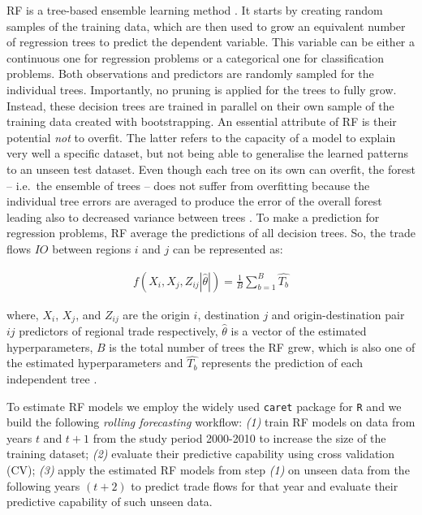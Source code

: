 \documentclass[sigconf]{acmart}
\begin{document}
RF is a tree-based ensemble learning method \citep{breiman2001random}.
It starts by creating random samples of the training data, which are
then used to grow an equivalent number of regression trees to predict
the dependent variable. This variable can be either a continuous one for
regression problems or a categorical one for classification problems.
Both observations and predictors are randomly sampled for the individual
trees. Importantly, no pruning is applied for the trees to fully grow.
Instead, these decision trees are trained in parallel on their own
sample of the training data created with bootstrapping. An essential
attribute of RF is their potential \emph{not} to overfit. The latter
refers to the capacity of a model to explain very well a specific
dataset, but not being able to generalise the learned patterns to an
unseen test dataset. Even though each tree on its own can overfit, the
forest -- i.e.~the ensemble of trees -- does not suffer from overfitting
because the individual tree errors are averaged to produce the error of
the overall forest leading also to decreased variance between trees
\citep{last2002improving}. To make a prediction for regression problems,
RF average the predictions of all decision trees. So, the trade flows
\(IO\) between regions \(i\) and \(j\) can be represented as:

\begin{align}
	f(X_{i}, X_{j}, Z_{ij}|\hat{\theta}|) = \frac{1}{B} \sum_{b = 1}^{B} \hat{T_{b}} \label{eq:trees}
\end{align}

where, \(X_{i}\), \(X_{j}\), and \(Z_{ij}\) are the origin \(i\),
destination \(j\) and origin-destination pair \(ij\) predictors of
regional trade respectively, \(\hat{\theta}\) is a vector of the
estimated hyperparameters, \(B\) is the total number of trees the RF
grew, which is also one of the estimated hyperparameters and
\(\hat{T_{b}}\) represents the prediction of each independent tree
\citep{yan2020using}.

To estimate RF models we employ the widely used \texttt{caret} package
for \texttt{R} \citep{kuhn2008building} and we build the following
\emph{rolling forecasting} workflow: \emph{(1)} train RF models on data
from years \(t\) and \(t + 1\) from the study period 2000-2010 to
increase the size of the training dataset; \emph{(2)} evaluate their
predictive capability using cross validation (CV); \emph{(3)} apply the
estimated RF models from step \emph{(1)} on unseen data from the
following years \((t + 2)\) to predict trade flows for that year and
evaluate their predictive capability of such unseen data.
\end{document}
